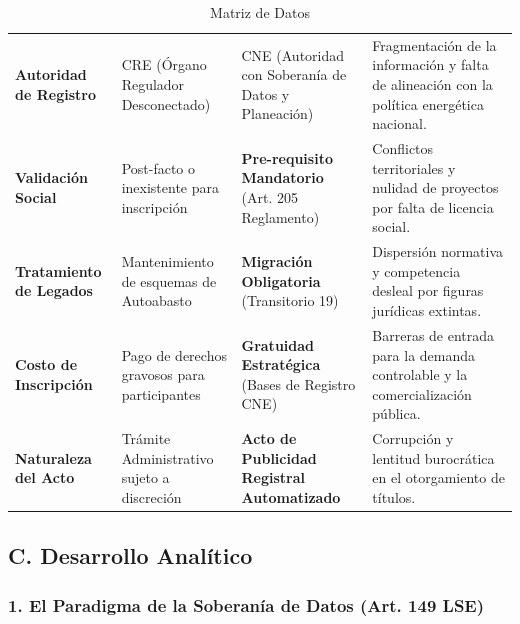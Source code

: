 \documentclass{cel}
\begin{document}
\vspace{0.3cm}
\begin{tabladoradoLargo}
\renewcommand{\tabularxcolumn}[1]{p{#1}}
\begin{xltabular}{\textwidth}{|X|X|X|X|}
\caption{Matriz de Datos} \\
\toprule
{}  &  &  &  \\
\midrule
\endhead
\textbf{Autoridad de Registro} & CRE (Órgano Regulador Desconectado) & CNE (Autoridad con Soberanía de Datos y Planeación) & Fragmentación de la información y falta de alineación con la política energética nacional. \\ \hline
\textbf{Validación Social} & Post-facto o inexistente para inscripción & \textbf{Pre-requisito Mandatorio} (Art. 205 Reglamento) & Conflictos territoriales y nulidad de proyectos por falta de licencia social. \\ \hline
\textbf{Tratamiento de Legados} & Mantenimiento de esquemas de \textquotedbl{}Autoabasto\textquotedbl{} & \textbf{Migración Obligatoria} (Transitorio 19) & Dispersión normativa y competencia desleal por figuras jurídicas extintas. \\ \hline
\textbf{Costo de Inscripción} & Pago de derechos gravosos para participantes & \textbf{Gratuidad Estratégica} (Bases de Registro CNE) & Barreras de entrada para la demanda controlable y la comercialización pública. \\ \hline
\textbf{Naturaleza del Acto} & Trámite Administrativo sujeto a discreción & \textbf{Acto de Publicidad Registral Automatizado} & Corrupción y lentitud burocrática en el otorgamiento de títulos. \\ \hline
\bottomrule
\end{xltabular}
\end{tabladoradoLargo}


\subsection{C. Desarrollo Analítico}
\nopagebreak

\subsubsection{1. El Paradigma de la Soberanía de Datos (Art. 149 LSE)}
\nopagebreak
\end{document}
